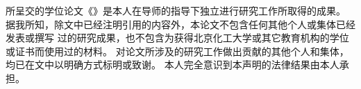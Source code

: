 \begin{declare}
	所呈交的学位论文《\thesistitle》是本人在导师的指导下独立进行研究工作所取得的成果。
	据我所知，除文中已经注明引用的内容外，本论文不包含任何其他个人或集体已经发表或撰写
	过的研究成果，也不包含为获得北京化工大学或其它教育机构的学位或证书而使用过的材料。
	对论文所涉及的研究工作做出贡献的其他个人和集体，均已在文中以明确方式标明或致谢。
	本人完全意识到本声明的法律结果由本人承担。
\end{declare}
